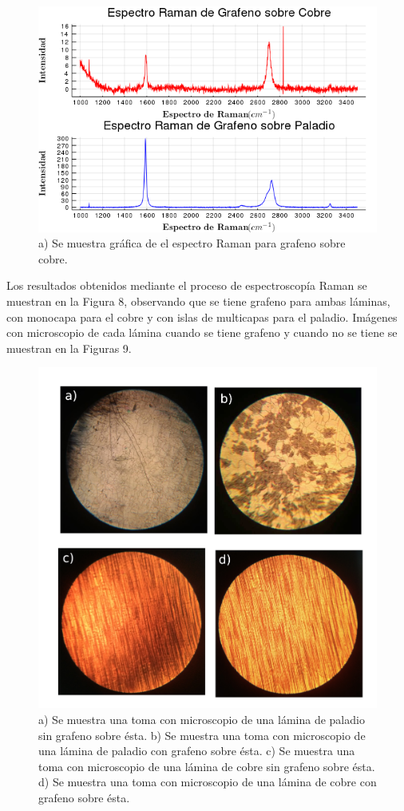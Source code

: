 \documentclass[twocolumn,letterpaper,aps,pra,10pt]{revtex4-1}
\begin{document}
\begin{figure}[h]
\centering
\includegraphics[scale=0.4]{Espectro_Raman.png}
\caption{a) Se muestra gráfica de el espectro Raman para grafeno sobre cobre.}
\end{figure}


Los resultados obtenidos mediante el proceso de espectroscopía Raman se muestran en la Figura 8, observando que se tiene grafeno para ambas láminas, con monocapa para el cobre y con islas de multicapas para el paladio. Imágenes con microscopio  de cada lámina cuando se tiene grafeno y cuando no se tiene se muestran en la Figuras 9.

\begin{figure}[h]
\centering
\includegraphics[scale=0.3]{Laminas_sin_con_grafeno.png}
\caption{a) Se muestra una toma con microscopio de una lámina de paladio sin grafeno sobre ésta. b) Se muestra una toma con microscopio de una lámina de paladio con grafeno sobre ésta. c) Se muestra una toma con microscopio de una lámina de cobre sin grafeno sobre ésta. d) Se muestra una toma con microscopio de una lámina de cobre con grafeno sobre ésta.}
\end{figure}
\end{document}
